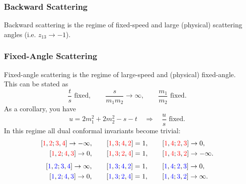 \subsubsection{Backward Scattering}
Backward scattering is the regime of fixed-speed and large (physical) scattering angles (i.e. $z_{13} \rightarrow -1$).
\subsubsection{Fixed-Angle Scattering}
Fixed-angle scattering is the regime of large-speed and (physical) fixed-angle. This can be stated as
\begin{equation}
	\frac{t}{s} \text{ fixed}, \qquad \frac{s}{m_{1} m_{2}} \rightarrow \infty, \qquad \frac{m_{1}}{m_{2}} \text{ fixed}.
\end{equation}
As a corollary, you have
\begin{equation}
	u = 2m_{1}^{2} + 2m_{2}^{2} - s - t \quad \Longrightarrow \quad \frac{u}{s} \text{ fixed}.
\end{equation}
In this regime all dual conformal invariants become trivial:
\begin{equation}
\begin{split}
	\left[ {\color{red} 1} , {\color{red} 2} ; {\color{red} 3} , {\color{red} 4} \right] \rightarrow -\infty, \qquad
	\left[ {\color{red} 1} , {\color{red} 3} ; {\color{red} 4} , {\color{red} 2} \right] &= 1, \qquad
	\left[ {\color{red} 1} , {\color{red} 4} ; {\color{red} 2} , {\color{red} 3} \right] \rightarrow 0, \\
	\left[ {\color{red} 1} , {\color{red} 2} ; {\color{red} 4} , {\color{red} 3} \right] \rightarrow 0, \qquad
	\left[ {\color{red} 1} , {\color{red} 3} ; {\color{red} 2} , {\color{red} 4} \right] &= 1, \qquad
	\left[ {\color{red} 1} , {\color{red} 4} ; {\color{red} 3} , {\color{red} 2} \right] \rightarrow -\infty.
\end{split}
\end{equation}
\begin{equation}
\begin{split}
	\left[ {\color{blue} 1} , {\color{blue} 2} ; {\color{blue} 3} , {\color{blue} 4} \right] \rightarrow \infty, \qquad
	\left[ {\color{blue} 1} , {\color{blue} 3} ; {\color{blue} 4} , {\color{blue} 2} \right] &= 1, \qquad
	\left[ {\color{blue} 1} , {\color{blue} 4} ; {\color{blue} 2} , {\color{blue} 3} \right] \rightarrow 0, \\
	\left[ {\color{blue} 1} , {\color{blue} 2} ; {\color{blue} 4} , {\color{blue} 3} \right] \rightarrow 0, \qquad
	\left[ {\color{blue} 1} , {\color{blue} 3} ; {\color{blue} 2} , {\color{blue} 4} \right] &= 1, \qquad
	\left[ {\color{blue} 1} , {\color{blue} 4} ; {\color{blue} 3} , {\color{blue} 2} \right] \rightarrow \infty.
\end{split}
\end{equation}
